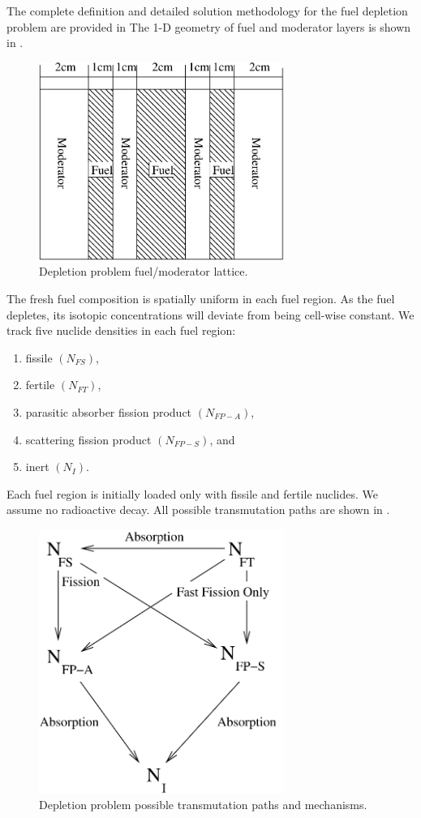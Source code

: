 The complete definition and detailed solution methodology for the fuel depletion problem are provided in %
The 1-D geometry of fuel and moderator layers is shown in .  
\begin{figure}[!htp]
\begin{center}
\includegraphics[width=8cm]{chapter5_depletion/article_grid.pdf}
\end{center}
\caption{Depletion problem fuel/moderator lattice.}
\label{fig:lattice}
\end{figure}
The fresh fuel composition is spatially uniform in each fuel region.
As the fuel depletes, its isotopic concentrations will deviate from being cell-wise constant.
We track five nuclide densities in  each fuel region:
\begin{enumerate}
\item fissile $(N_{FS})$,
\item fertile $(N_{FT})$,
\item parasitic absorber fission product $(N_{FP-A})$,
\item scattering fission product $(N_{FP-S})$, and
\item inert $(N_I)$.
\end{enumerate}
Each fuel region is initially loaded only with fissile and fertile nuclides.  
We assume no radioactive decay.
All possible transmutation paths are shown in .
\begin{figure}[!htp]
\begin{center}
\includegraphics[width=8cm]{chapter5_depletion/article_transmutation.pdf}
\end{center}
\caption{Depletion problem possible transmutation paths and mechanisms.}
\label{fig:transmutation}
\end{figure}
